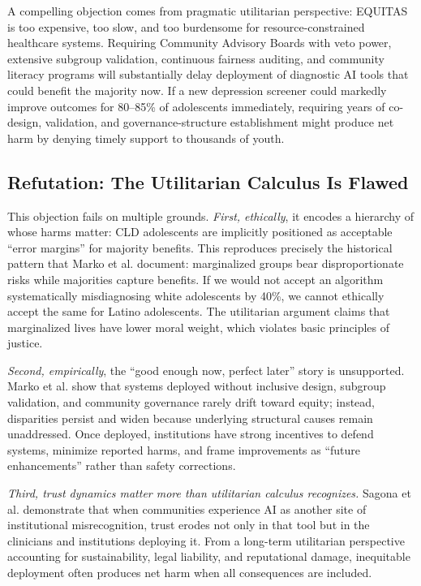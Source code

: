 \documentclass[12pt,a4paper]{article}
\begin{document}
A compelling objection comes from pragmatic utilitarian perspective: EQUITAS is too expensive, too slow, and too burdensome for resource-constrained healthcare systems.\cite{munn_idai700} Requiring Community Advisory Boards with veto power, extensive subgroup validation, continuous fairness auditing, and community literacy programs will substantially delay deployment of diagnostic AI tools that could benefit the majority now. If a new depression screener could markedly improve outcomes for 80--85\% of adolescents immediately, requiring years of co-design, validation, and governance-structure establishment might produce net harm by denying timely support to thousands of youth.\cite{munn_idai700}

\subsection{Refutation: The Utilitarian Calculus Is Flawed}

This objection fails on multiple grounds. \textit{First, ethically}, it encodes a hierarchy of whose harms matter: CLD adolescents are implicitly positioned as acceptable ``error margins'' for majority benefits. This reproduces precisely the historical pattern that Marko et al. document: marginalized groups bear disproportionate risks while majorities capture benefits.\cite{marko2025} If we would not accept an algorithm systematically misdiagnosing white adolescents by 40\%, we cannot ethically accept the same for Latino adolescents. The utilitarian argument claims that marginalized lives have lower moral weight, which violates basic principles of justice.\cite{garcia_ed415}

\textit{Second, empirically}, the ``good enough now, perfect later'' story is unsupported. Marko et al. show that systems deployed without inclusive design, subgroup validation, and community governance rarely drift toward equity; instead, disparities persist and widen because underlying structural causes remain unaddressed.\cite{marko2025} Once deployed, institutions have strong incentives to defend systems, minimize reported harms, and frame improvements as ``future enhancements'' rather than safety corrections.\cite{marko2025}

\textit{Third, trust dynamics matter more than utilitarian calculus recognizes.} Sagona et al. demonstrate that when communities experience AI as another site of institutional misrecognition, trust erodes not only in that tool but in the clinicians and institutions deploying it.\cite{sagona2025} From a long-term utilitarian perspective accounting for sustainability, legal liability, and reputational damage, inequitable deployment often produces net harm when all consequences are included.\cite{sagona2025}
\end{document}
